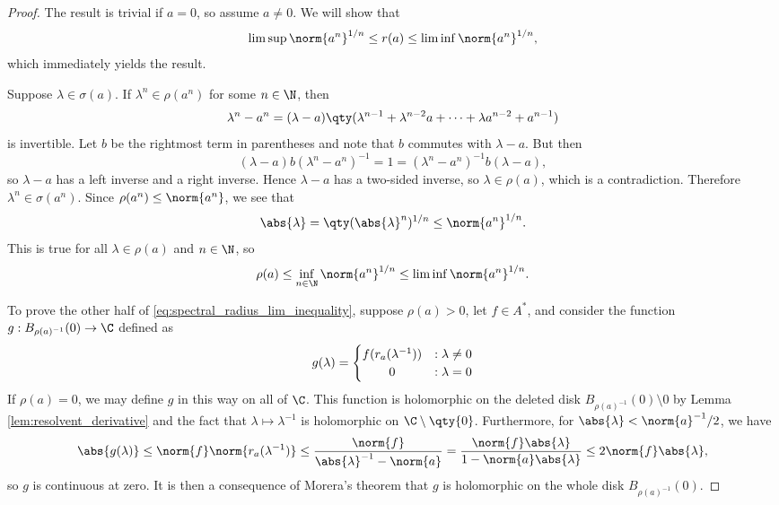 \begin{proof}
The result is trivial if $a = 0$, so assume $a \neq 0$. We will show that
\begin{equation}\label{eq:spectral_radius_lim_inequality}
\limsup \norm{a^n}^{1/n} \leq r(a) \leq \liminf \norm{a^n}^{1/n},
\end{equation}
which immediately yields the result.

Suppose $\lambda \in \sigma(a)$. If $\lambda^n \in \rho(a^n)$ for some $n \in \N$, then
\begin{equation}
\lambda^n - a^n = (\lambda - a) \qty(\lambda^{n-1} + \lambda^{n-2}a + \cdots + \lambda a^{n-2} + a^{n-1})
\end{equation}
is invertible. Let $b$ be the rightmost term in parentheses and note that $b$ commutes with $\lambda - a$. But then
\begin{equation}
(\lambda - a)b(\lambda^n - a^n)^{-1} = 1 = (\lambda^n - a^n)^{-1}b (\lambda - a),
\end{equation}
so $\lambda - a$ has a left inverse and a right inverse. Hence $\lambda - a$ has a two-sided inverse, so $\lambda \in \rho(a)$, which is a contradiction. Therefore $\lambda^n \in \sigma(a^n)$. Since $\rho(a^n) \leq \norm{a^n}$, we see that
\begin{equation}
\abs{\lambda} = \qty(\abs{\lambda}^n)^{1/n} \leq \norm{a^n}^{1/n}.
\end{equation}
This is true for all $\lambda \in \rho(a)$ and $n \in \N$, so
\begin{equation}
\rho(a) \leq \inf_{n \in \N} \norm{a^n}^{1/n} \leq \liminf \norm{a^n}^{1/n}.
\end{equation}

To prove the other half of \eqref{eq:spectral_radius_lim_inequality}, suppose $\rho(a) > 0$, let $f \in A^*$, and consider the function $g:B_{\rho(a)^{-1}}(0) \rightarrow \C$ defined as
\begin{equation}
g(\lambda) = \begin{cases} \hfil f(r_a(\lambda^{-1})) &: \lambda \neq 0\\ \hfil 0 &: \lambda = 0\end{cases}
\end{equation}
If $\rho(a) = 0$, we may define $g$ in this way on all of $\C$. This function is holomorphic on the deleted disk $B_{\rho(a)^{-1}}(0) \setminus \qty{0}$ by Lemma \ref{lem:resolvent_derivative} and the fact that $\lambda \mapsto \lambda^{-1}$ is holomorphic on $\C \setminus \qty{0}$. Furthermore, for $\abs{\lambda} < \norm{a}^{-1}/2$, we have 
\begin{equation}
\abs{g(\lambda)} \leq \norm{f} \norm{r_a(\lambda^{-1})} \leq \frac{\norm{f}}{\abs{\lambda}^{-1} - \norm{a}} = \frac{\norm{f}\abs{\lambda}}{1 - \norm{a}\abs{\lambda}} \leq 2 \norm{f}\abs{\lambda},
\end{equation}
so $g$ is continuous at zero. It is then a consequence of Morera's theorem that $g$ is holomorphic on the whole disk $B_{\rho(a)^{-1}}(0)$. 


\end{proof}
